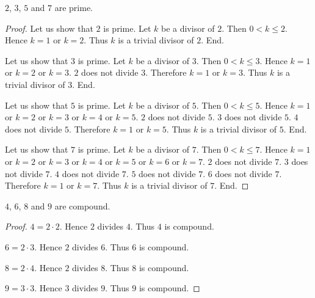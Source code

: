 \documentclass[../../arithmetic.tex]{subfiles}
\begin{document}
  \begin{forthel}
    \begin{proposition}\label{Arithmetic_03_04_175431}
      $2$, $3$, $5$ and $7$ are prime.
    \end{proposition}
    \begin{proof}
      Let us show that $2$ is prime.
        Let $k$ be a divisor of $2$.
        Then $0 < k \leq 2$.
        Hence $k = 1$ or $k = 2$.
        Thus $k$ is a trivial divisor of $2$.
      End.

      Let us show that $3$ is prime.
        Let $k$ be a divisor of $3$.
        Then $0 < k \leq 3$.
        Hence $k = 1$ or $k = 2$ or $k = 3$.
        $2$ does not divide $3$.
        Therefore $k = 1$ or $k = 3$.
        Thus $k$ is a trivial divisor of $3$.
      End.

      Let us show that $5$ is prime.
        Let $k$ be a divisor of $5$.
        Then $0 < k \leq 5$.
        Hence $k = 1$ or $k = 2$ or $k = 3$ or $k = 4$ or $k = 5$.
        $2$ does not divide $5$.
        $3$ does not divide $5$.
        $4$ does not divide $5$.
        Therefore $k = 1$ or $k = 5$.
        Thus $k$ is a trivial divisor of $5$.
      End.

      Let us show that $7$ is prime.
        Let $k$ be a divisor of $7$.
        Then $0 < k \leq 7$.
        Hence $k = 1$ or $k = 2$ or $k = 3$ or $k = 4$ or $k = 5$ or $k = 6$ or $k = 7$.
        $2$ does not divide $7$.
        $3$ does not divide $7$.
        $4$ does not divide $7$.
        $5$ does not divide $7$.
        $6$ does not divide $7$.
        Therefore $k = 1$ or $k = 7$.
        Thus $k$ is a trivial divisor of $7$.
      End.
    \end{proof}

    \begin{proposition}\label{Arithmetic_03_04_985728}
      $4$, $6$, $8$ and $9$ are compound.
    \end{proposition}
    \begin{proof}
      $4 = 2 \cdot 2$.
      Hence $2$ divides $4$.
      Thus $4$ is compound.

      $6 = 2 \cdot 3$.
      Hence $2$ divides $6$.
      Thus $6$ is compound.

      $8 = 2 \cdot 4$.
      Hence $2$ divides $8$.
      Thus $8$ is compound.

      $9 = 3 \cdot 3$.
      Hence $3$ divides $9$.
      Thus $9$ is compound.
    \end{proof}
  \end{forthel}
\end{document}
